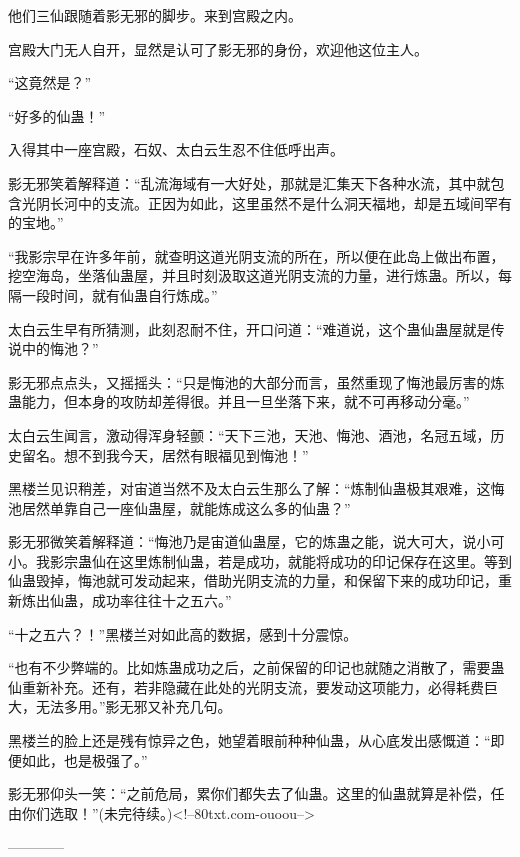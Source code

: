 \begin{this_body}
他们三仙跟随着影无邪的脚步。来到宫殿之内。

宫殿大门无人自开，显然是认可了影无邪的身份，欢迎他这位主人。

“这竟然是？”

“好多的仙蛊！”

入得其中一座宫殿，石奴、太白云生忍不住低呼出声。

影无邪笑着解释道：“乱流海域有一大好处，那就是汇集天下各种水流，其中就包含光阴长河中的支流。正因为如此，这里虽然不是什么洞天福地，却是五域间罕有的宝地。”

“我影宗早在许多年前，就查明这道光阴支流的所在，所以便在此岛上做出布置，挖空海岛，坐落仙蛊屋，并且时刻汲取这道光阴支流的力量，进行炼蛊。所以，每隔一段时间，就有仙蛊自行炼成。”

太白云生早有所猜测，此刻忍耐不住，开口问道：“难道说，这个蛊仙蛊屋就是传说中的悔池？”

影无邪点点头，又摇摇头：“只是悔池的大部分而言，虽然重现了悔池最厉害的炼蛊能力，但本身的攻防却差得很。并且一旦坐落下来，就不可再移动分毫。”

太白云生闻言，激动得浑身轻颤：“天下三池，天池、悔池、酒池，名冠五域，历史留名。想不到我今天，居然有眼福见到悔池！”

黑楼兰见识稍差，对宙道当然不及太白云生那么了解：“炼制仙蛊极其艰难，这悔池居然单靠自己一座仙蛊屋，就能炼成这么多的仙蛊？”

影无邪微笑着解释道：“悔池乃是宙道仙蛊屋，它的炼蛊之能，说大可大，说小可小。我影宗蛊仙在这里炼制仙蛊，若是成功，就能将成功的印记保存在这里。等到仙蛊毁掉，悔池就可发动起来，借助光阴支流的力量，和保留下来的成功印记，重新炼出仙蛊，成功率往往十之五六。”

“十之五六？！”黑楼兰对如此高的数据，感到十分震惊。

“也有不少弊端的。比如炼蛊成功之后，之前保留的印记也就随之消散了，需要蛊仙重新补充。还有，若非隐藏在此处的光阴支流，要发动这项能力，必得耗费巨大，无法多用。”影无邪又补充几句。

黑楼兰的脸上还是残有惊异之色，她望着眼前种种仙蛊，从心底发出感慨道：“即便如此，也是极强了。”

影无邪仰头一笑：“之前危局，累你们都失去了仙蛊。这里的仙蛊就算是补偿，任由你们选取！”(未完待续。)<!--80txt.com-ouoou-->

------------

\end{this_body}

